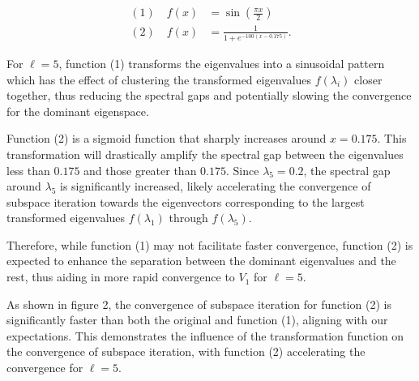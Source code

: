 \documentclass[11pt,onecolumn]{article}
\begin{document}
\begin{enumerate}[label=(\alph*)]
          \begin{equation*}
              \begin{aligned}
                  (1) \quad f(x) & = \sin\left(\frac{\pi x}{2}\right) \\
                  (2) \quad f(x) & = \frac{1}{1+e^{-100(x-0.175)}}.
              \end{aligned}
          \end{equation*}

          For \( \ell = 5 \), function (1) transforms the eigenvalues into a sinusoidal pattern which has the effect of clustering the transformed eigenvalues \( f(\lambda_i) \) closer together, thus reducing the spectral gaps and potentially slowing the convergence for the dominant eigenspace.

          Function (2) is a sigmoid function that sharply increases around \( x = 0.175 \). This transformation will drastically amplify the spectral gap between the eigenvalues less than \( 0.175 \) and those greater than \( 0.175 \). Since \( \lambda_5 = 0.2 \), the spectral gap around \( \lambda_5 \) is significantly increased, likely accelerating the convergence of subspace iteration towards the eigenvectors corresponding to the largest transformed eigenvalues \( f(\lambda_1) \) through \( f(\lambda_5) \).

          Therefore, while function (1) may not facilitate faster convergence, function (2) is expected to enhance the separation between the dominant eigenvalues and the rest, thus aiding in more rapid convergence to \( V_1 \) for \( \ell = 5 \).

          As shown in figure 2, the convergence of subspace iteration for function (2) is significantly faster than both the original and function (1), aligning with our expectations. This demonstrates the influence of the transformation function on the convergence of subspace iteration, with function (2) accelerating the convergence for \( \ell = 5 \).

\end{enumerate}
\end{document}
